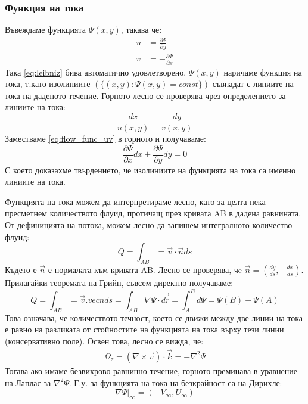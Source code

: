 \subsubsection{Функция на тока}
Въвеждаме функцията $\Psi(x,y)$, такава че:
\begin{align}
    \label{eq:flow_func_uv}
    u &= \frac{\partial \Psi}{\partial y} \\
    v &= -\frac{\partial \Psi}{\partial x} \nonumber
\end{align}
Така \autoref{eq:leibniz} бива автоматично удовлетворено. $\Psi(x,y)$ наричаме функция на тока, т.като изолиниите $\left(\{(x,y): \Psi(x,y) = const\}\right)$ съвпадат с линиите на тока на даденото течение.
Горното лесно се проверява чрез определението за линиите на тока:
\begin{equation*}
    \frac{dx}{u(x,y)} = \frac{dy}{v(x,y)} 
\end{equation*}
Заместваме \autoref{eq:flow_func_uv} в горното и получаваме:
\begin{equation*}
    \frac{\partial \Psi}{\partial x} d x + \frac{\partial \Psi}{\partial y} d y = 0
\end{equation*}
С което доказахме твърдението, че изолиниите на функцията на тока са именно линиите на тока.

Функцията на тока можем да интерпретираме лесно, като за целта нека пресметнем количеството флуид, протичащ през кривата AB в дадена равнината. От дефиницията на потока, можем лесно да запишем интегралното количество флуид:
\begin{equation*}
    Q = \int_{AB} = \vec{v} \cdot \vec{n} ds
\end{equation*}
Където е $\vec{n}$ е нормалата към кривата AB. Лесно се проверява, чe $\vec{n} = (\frac{dy}{ds}, -\frac{d x}{d s})$. Прилагайки теоремата на Грийн, съвсем директно получаваме:
\begin{equation}
    Q = \int_{AB} = \vec{v}.vec{n} ds = \int_{AB} \nabla \Psi \cdot \vec{dr} = \int_{A}^{B} d \Psi = \Psi(B) - \Psi(A) 
\end{equation}
Това означава, че количеството течност, което се движи между две линии на тока е равно на разликата от стойностите на функцията на тока върху тези линии (консервативно поле).
Освен това, лесно се вижда, че:
\begin{align*}
    \Omega_z = (\nabla \times \vec{v}) \cdot \vec{k} = - \nabla^2 \Psi
\end{align*}
Тогава ако имаме безвихрово равнинно течение, горното преминава в уравнение на Лаплас за $\nabla^2 \Psi$.
Г.у. за функцията на тока на безкрайност са на Дирихле:
\begin{equation*}
    \nabla \Psi \big|_\infty = (-V_\infty, U_\infty)
\end{equation*}

